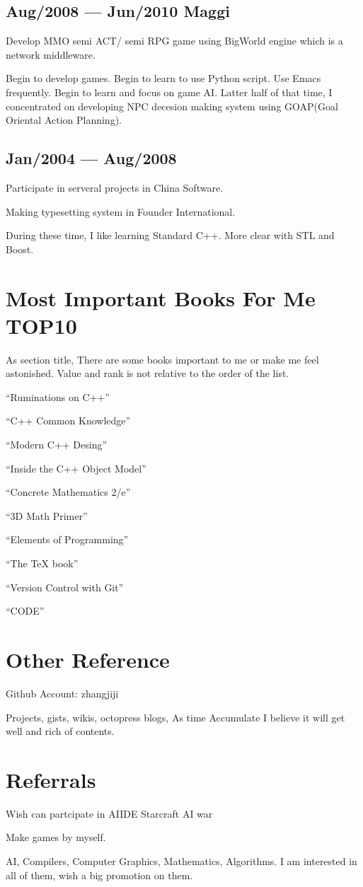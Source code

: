 \documentclass{article}
\begin{document}
\subsection*{Aug/2008 --- Jun/2010 \quad Maggi}

Develop MMO semi ACT/ semi RPG game using BigWorld engine which is a network middleware.

Begin to develop games. Begin to learn to use Python script. Use Emacs frequently. Begin to learn and focus on game AI. Latter half of that time, I concentrated on developing NPC decesion making system using GOAP(Goal Oriental Action Planning).

\subsection*{Jan/2004 --- Aug/2008}

Participate in serveral projects in China Software.

Making typesetting system in Founder International.

During these time, I like learning Standard C++. More clear with STL and Boost.

\section*{Most Important Books For Me TOP10}

As section title, There are some books important to me or make me feel astonished. Value and rank is not relative to the order of the list.

``Ruminations on C++''

``C++ Common Knowledge''

``Modern C++ Desing''

``Inside the C++ Object Model''

``Concrete Mathematics 2/e''

``3D Math Primer''

``Elements of Programming''

``The {\TeX} book''

``Version Control with Git''

``CODE''

\section*{Other Reference}

Github Account: zhangjiji

Projects, gists, wikis, octopress blogs, As time Accumulate I believe it will get well and rich of contents.

\section*{Referrals}

Wish can partcipate in AIIDE Starcraft AI war

Make games by myself.

AI, Compilers, Computer Graphics, Mathematics, Algorithms. I am interested in all of them, wish a big promotion on them.
\end{document}
